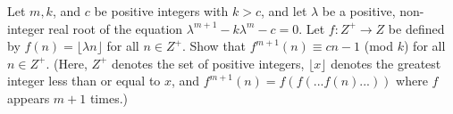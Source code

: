 Let $m, k$, and $c$ be positive integers with $k > c$, and let $\lambda$ be a positive, non-integer real root of the equation  $\lambda^{m+1} - k \lambda^m - c = 0$. Let $f : Z^+ \to Z$ be defined by $f(n) = \lfloor \lambda n \rfloor$ for all $n \in  Z^+$. Show that $f^{m+1}(n) \equiv cn - 1$ (mod $k$) for all $n \in Z^+$. (Here, $Z^+$ denotes the set of positive integers, $ \lfloor x \rfloor$ denotes the greatest integer less than or equal to $x$, and $f^{m+1}(n) = f(f(... f(n)...))$ where $f$ appears $m + 1$ times.)
